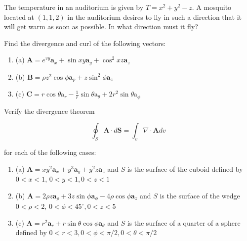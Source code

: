 \begin{problema}
    The temperature in an auditorium is given by $T=x^{2}+y^{2}-z$. A mosquito located at $(1,1,2)$ in the auditorium desires to lly in such a direction that it will get warm as soon as possible. In what direction must it fly?
\end{problema}

\begin{problema}
    Find the divergence and curl of the following vectors:
    \begin{enumerate}
        \item (a) $\mathbf{A}=e^{v y} \mathbf{a}_{x}+\sin x y \mathbf{a}_{y}+\cos ^{2} x z \mathbf{a}_{z}$
        \item (b) $\mathbf{B}=\rho z^{2} \cos \phi \mathbf{a}_{p}+z \sin ^{2} \phi \mathbf{a}_{z}$
        \item (c) $\mathbf{C}=r \cos \theta \mathrm{a}_{r}-\frac{1}{r} \sin \theta \mathrm{a}_{\theta}+2 r^{2} \sin \theta \mathrm{a}_{\phi}$ 
    \end{enumerate}
    
\end{problema}

\begin{problema}

Verify the divergence theorem

$$
\oint_{S} \mathbf{A} \cdot d \mathbf{S}=\int_{v} \nabla \cdot \mathbf{A} d v
$$

for each of the following cases:

\begin{enumerate}
    \item (a) $\mathbf{A}=x y^{2} \mathbf{a}_{x}+y^{3} \mathbf{a}_{y}+y^{2} z \mathbf{a}_{z}$ and $S$ is the surface of the cuboid defined by $0<x<1$, $0<y<1,0<z<1$

    \item (b) $\mathbf{A}=2 \rho z \mathbf{a}_{\rho}+3 z \sin \phi \mathbf{a}_{\phi}-4 \rho \cos \phi \mathbf{a}_{z}$ and $S$ is the surface of the wedge $0<\rho<2$, $0<\phi<45^{\circ}, 0<z<5$
    
    \item (c) $\mathbf{A}=r^{2} \mathbf{a}_{r}+r \sin \theta \cos \phi \mathbf{a}_{\theta}$ and $S$ is the surface of a quarter of a sphere defined by $0<r<3,0<\phi<\pi / 2,0<\theta<\pi / 2$
    
\end{enumerate}

\end{problema}

